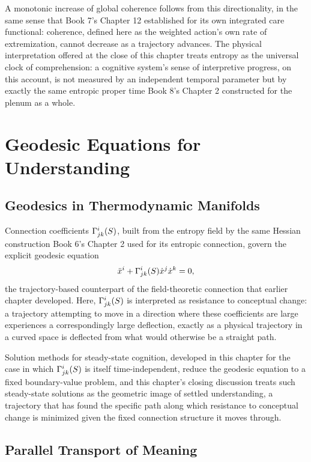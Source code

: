 A monotonic increase of global coherence follows from this directionality, in the same sense that Book 7's Chapter 12 established for its own integrated care functional: coherence, defined here as the weighted action's own rate of extremization, cannot decrease as a trajectory advances. The physical interpretation offered at the close of this chapter treats entropy as the universal clock of comprehension: a cognitive system's sense of interpretive progress, on this account, is not measured by an independent temporal parameter but by exactly the same entropic proper time Book 8's Chapter 2 constructed for the plenum as a whole.

\part{Geodesic Equations for Understanding}

\chapter{Geodesics in Thermodynamic Manifolds}

Connection coefficients $\Gamma^i_{jk}(S)$, built from the entropy field by the same Hessian construction Book 6's Chapter 2 used for its entropic connection, govern the explicit geodesic equation
\[
\ddot{x}^i + \Gamma^i_{jk}(S) \dot{x}^j \dot{x}^k = 0,
\]
the trajectory-based counterpart of the field-theoretic connection that earlier chapter developed. Here, $\Gamma^i_{jk}(S)$ is interpreted as resistance to conceptual change: a trajectory attempting to move in a direction where these coefficients are large experiences a correspondingly large deflection, exactly as a physical trajectory in a curved space is deflected from what would otherwise be a straight path.

Solution methods for steady-state cognition, developed in this chapter for the case in which $\Gamma^i_{jk}(S)$ is itself time-independent, reduce the geodesic equation to a fixed boundary-value problem, and this chapter's closing discussion treats such steady-state solutions as the geometric image of settled understanding, a trajectory that has found the specific path along which resistance to conceptual change is minimized given the fixed connection structure it moves through.

\chapter{Parallel Transport of Meaning}

